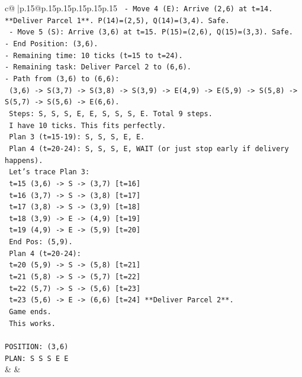 \documentclass{article}
\begin{document}
{\begin{supertabular}{c@{$\;$}|p{.15\linewidth}@{}p{.15\linewidth}p{.15\linewidth}p{.15\linewidth}p{.15\linewidth}p{.15\linewidth}}
{{{\texttt{  {-} Move 4 (E): Arrive (2,6) at t=14. **Deliver Parcel 1**. P(14)=(2,5), Q(14)=(3,4). Safe.} \\
\texttt{  {-} Move 5 (S): Arrive (3,6) at t=15. P(15)=(2,6), Q(15)=(3,3). Safe.} \\
\texttt{{-} End Position: (3,6).} \\
\texttt{{-} Remaining time: 10 ticks (t=15 to t=24).} \\
\texttt{{-} Remaining task: Deliver Parcel 2 to (6,6).} \\
\texttt{{-} Path from (3,6) to (6,6):} \\
\texttt{  (3,6) {-}> S(3,7) {-}> S(3,8) {-}> S(3,9) {-}> E(4,9) {-}> E(5,9) {-}> S(5,8) {-}> S(5,7) {-}> S(5,6) {-}> E(6,6).} \\
\texttt{  Steps: S, S, S, E, E, S, S, S, E. Total 9 steps.} \\
\texttt{  I have 10 ticks. This fits perfectly.} \\
\texttt{  Plan 3 (t=15{-}19): S, S, S, E, E.} \\
\texttt{  Plan 4 (t=20{-}24): S, S, S, E, WAIT (or just stop early if delivery happens).} \\
\texttt{  Let's trace Plan 3:} \\
\texttt{  t=15 (3,6) {-}> S {-}> (3,7) {[}t=16{]}} \\
\texttt{  t=16 (3,7) {-}> S {-}> (3,8) {[}t=17{]}} \\
\texttt{  t=17 (3,8) {-}> S {-}> (3,9) {[}t=18{]}} \\
\texttt{  t=18 (3,9) {-}> E {-}> (4,9) {[}t=19{]}} \\
\texttt{  t=19 (4,9) {-}> E {-}> (5,9) {[}t=20{]}} \\
\texttt{  End Pos: (5,9).} \\
\texttt{  Plan 4 (t=20{-}24):} \\
\texttt{  t=20 (5,9) {-}> S {-}> (5,8) {[}t=21{]}} \\
\texttt{  t=21 (5,8) {-}> S {-}> (5,7) {[}t=22{]}} \\
\texttt{  t=22 (5,7) {-}> S {-}> (5,6) {[}t=23{]}} \\
\texttt{  t=23 (5,6) {-}> E {-}> (6,6) {[}t=24{]} **Deliver Parcel 2**.} \\
\texttt{  Game ends.} \\
\texttt{  This works.} \\
\\ 
\texttt{POSITION: (3,6)} \\
\texttt{PLAN: S S S E E} \\
            }
        }
    }
    & & \\ \\


\end{supertabular}}
\end{document}
